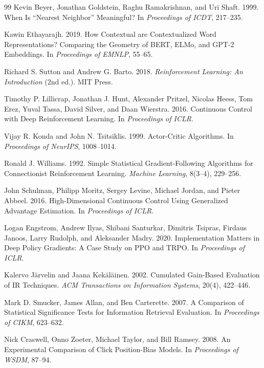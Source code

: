 \documentclass[sigconf]{acmart}
\begin{document}
\begin{thebibliography}{99}
Kevin Beyer, Jonathan Goldstein, Raghu Ramakrishnan, and Uri Shaft. 1999. When Is ``Nearest Neighbor'' Meaningful? In \textit{Proceedings of ICDT}, 217--235.

Kawin Ethayarajh. 2019. How Contextual are Contextualized Word Representations? Comparing the Geometry of BERT, ELMo, and GPT-2 Embeddings. In \textit{Proceedings of EMNLP}, 55--65.

Richard S. Sutton and Andrew G. Barto. 2018. \textit{Reinforcement Learning: An Introduction} (2nd ed.). MIT Press.

Timothy P. Lillicrap, Jonathan J. Hunt, Alexander Pritzel, Nicolas Heess, Tom Erez, Yuval Tassa, David Silver, and Daan Wierstra. 2016. Continuous Control with Deep Reinforcement Learning. In \textit{Proceedings of ICLR}.

Vijay R. Konda and John N. Tsitsiklis. 1999. Actor-Critic Algorithms. In \textit{Proceedings of NeurIPS}, 1008--1014.

Ronald J. Williams. 1992. Simple Statistical Gradient-Following Algorithms for Connectionist Reinforcement Learning. \textit{Machine Learning}, 8(3--4), 229--256.

John Schulman, Philipp Moritz, Sergey Levine, Michael Jordan, and Pieter Abbeel. 2016. High-Dimensional Continuous Control Using Generalized Advantage Estimation. In \textit{Proceedings of ICLR}.

Logan Engstrom, Andrew Ilyas, Shibani Santurkar, Dimitris Tsipras, Firdaus Janoos, Larry Rudolph, and Aleksander Madry. 2020. Implementation Matters in Deep Policy Gradients: A Case Study on PPO and TRPO. In \textit{Proceedings of ICLR}.

Kalervo J\"arvelin and Jaana Kek\"al\"ainen. 2002. Cumulated Gain-Based Evaluation of IR Techniques. \textit{ACM Transactions on Information Systems}, 20(4), 422--446.

Mark D. Smucker, James Allan, and Ben Carterette. 2007. A Comparison of Statistical Significance Tests for Information Retrieval Evaluation. In \textit{Proceedings of CIKM}, 623--632.

Nick Craswell, Onno Zoeter, Michael Taylor, and Bill Ramsey. 2008. An Experimental Comparison of Click Position-Bias Models. In \textit{Proceedings of WSDM}, 87--94.


\end{thebibliography}
\end{document}
